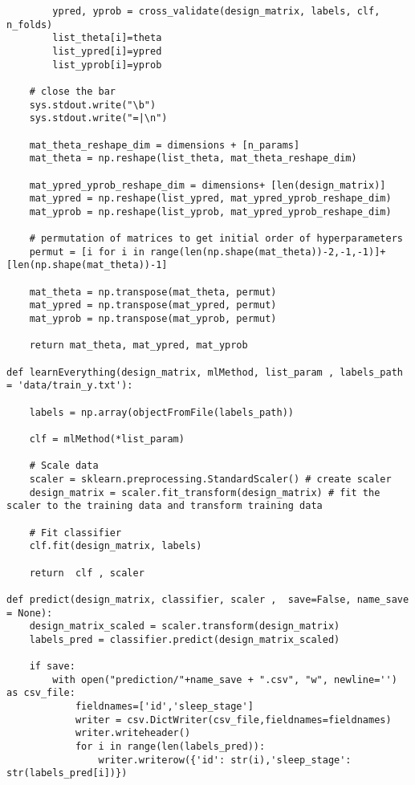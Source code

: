 \documentclass{article}
\begin{document}
\begin{lstlisting}
        ypred, yprob = cross_validate(design_matrix, labels, clf, n_folds)
        list_theta[i]=theta
        list_ypred[i]=ypred
        list_yprob[i]=yprob
    
    # close the bar
    sys.stdout.write("\b")
    sys.stdout.write("=|\n")
        
    mat_theta_reshape_dim = dimensions + [n_params]
    mat_theta = np.reshape(list_theta, mat_theta_reshape_dim)
    
    mat_ypred_yprob_reshape_dim = dimensions+ [len(design_matrix)]
    mat_ypred = np.reshape(list_ypred, mat_ypred_yprob_reshape_dim)
    mat_yprob = np.reshape(list_yprob, mat_ypred_yprob_reshape_dim)
    
    # permutation of matrices to get initial order of hyperparameters
    permut = [i for i in range(len(np.shape(mat_theta))-2,-1,-1)]+[len(np.shape(mat_theta))-1]
    
    mat_theta = np.transpose(mat_theta, permut)
    mat_ypred = np.transpose(mat_ypred, permut)
    mat_yprob = np.transpose(mat_yprob, permut)
    
    return mat_theta, mat_ypred, mat_yprob

def learnEverything(design_matrix, mlMethod, list_param , labels_path = 'data/train_y.txt'):
    
    labels = np.array(objectFromFile(labels_path))

    clf = mlMethod(*list_param)

    # Scale data
    scaler = sklearn.preprocessing.StandardScaler() # create scaler
    design_matrix = scaler.fit_transform(design_matrix) # fit the scaler to the training data and transform training data
    
    # Fit classifier
    clf.fit(design_matrix, labels)

    return  clf , scaler
      
def predict(design_matrix, classifier, scaler ,  save=False, name_save = None):
    design_matrix_scaled = scaler.transform(design_matrix)
    labels_pred = classifier.predict(design_matrix_scaled)
    
    if save:
        with open("prediction/"+name_save + ".csv", "w", newline='') as csv_file:
            fieldnames=['id','sleep_stage']
            writer = csv.DictWriter(csv_file,fieldnames=fieldnames)
            writer.writeheader()
            for i in range(len(labels_pred)):
                writer.writerow({'id': str(i),'sleep_stage': str(labels_pred[i])})
                

\end{lstlisting}
\end{document}
